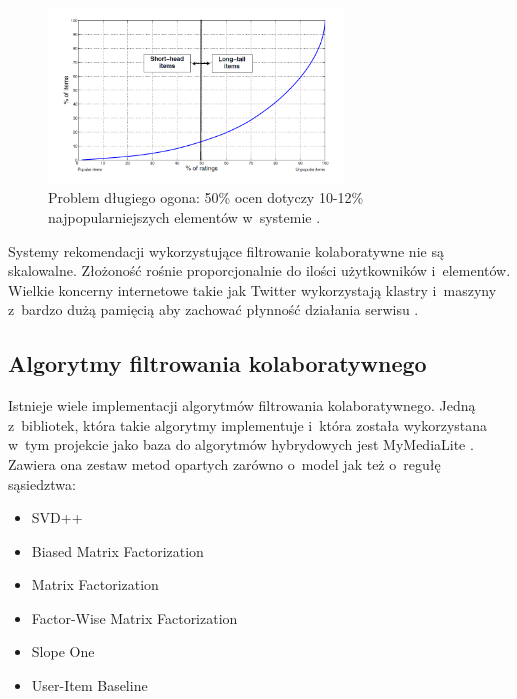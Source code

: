\documentclass[twoside]{iisthesis}
\begin{document}
	  \begin{figure}[!ht] 
	  	\centering
	  	\includegraphics[width=0.7\textwidth]{longtail}
	  	\caption{Problem długiego ogona: 50\% ocen dotyczy 10-12\% najpopularniejszych elementów w~systemie \protect\cite{id:RubensRecSysHB2010}.}
	  	\label{fig:longtail}
	  \end{figure}
	  
	  Systemy rekomendacji wykorzystujące filtrowanie kolaboratywne nie są skalowalne. Złożoność rośnie proporcjonalnie do ilości użytkowników i~elementów. Wielkie koncerny internetowe takie jak Twitter wykorzystają klastry i~maszyny z~bardzo dużą pamięcią aby zachować płynność działania serwisu \cite{id:gupta2013wtf}.
	 
	 \subsection{Algorytmy filtrowania kolaboratywnego}
	 
	 Istnieje wiele implementacji algorytmów filtrowania kolaboratywnego. Jedną z~bibliotek, która takie algorytmy implementuje i~która została wykorzystana w~tym projekcie jako baza do algorytmów hybrydowych jest MyMediaLite \cite{mymedialite,gantner2011mymedialite}. Zawiera ona zestaw metod opartych zarówno o~model jak też o~regułę sąsiedztwa:
	 
	 \begin{itemize}
	 	\item SVD++ \cite{koren2008factorization}
	 	\item Biased Matrix Factorization \cite{salakhutdinov2011probabilistic,rendle2008online}
	 	\item Matrix Factorization
	 	\item Factor-Wise Matrix Factorization \cite{bell2007modeling}
	 	\item Slope One \cite{lemire2005slope}
	 	\item User-Item Baseline \cite{koren2010factor}
	 \end{itemize}
	 
\end{document}
